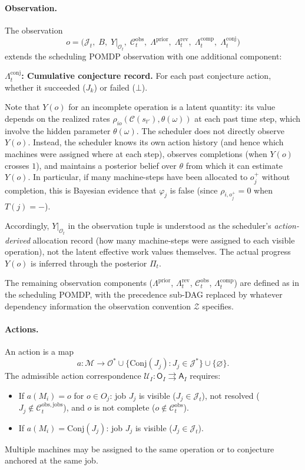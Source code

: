 \paragraph{Observation.} The observation
\[
o = \bigl(\mathcal{J}_t,\; B,\; Y|_{\mathcal{O}_t},\;
\mathcal{C}_t^{\mathrm{obs}},\;
\Lambda^{\mathrm{prior}},\; \Lambda_t^{\mathrm{rev}},\;
\Lambda_t^{\mathrm{comp}},\; \Lambda_t^{\mathrm{conj}}\bigr)
\]
extends the scheduling POMDP observation with one additional component:

\medskip
\noindent\textbf{$\Lambda_t^{\mathrm{conj}}$: Cumulative conjecture record.}
For each past conjecture action, whether it succeeded ($J_k$) or failed ($\bot$).

\medskip
\noindent Note that $Y(o)$ for an incomplete operation is a latent quantity: its
value depends on the realized rates
$\rho_{io}(\mathcal{C}(s_{t'}), \theta(\omega))$ at each past time step, which
involve the hidden parameter $\theta(\omega)$. The scheduler does not directly
observe $Y(o)$. Instead, the scheduler knows its own action history (and hence which
machines were assigned where at each step), observes completions (when $Y(o)$
crosses $1$), and maintains a posterior belief over $\theta$ from which it can
estimate $Y(o)$. In particular, if many machine-steps have been allocated to $o_j^+$
without completion, this is Bayesian evidence that $\varphi_j$ is false (since
$\rho_{i,o_j^+} = 0$ when $T(j) = -$).

Accordingly, $Y|_{\mathcal{O}_t}$ in the observation tuple is understood as the
scheduler's \emph{action-derived} allocation record (how many machine-steps were
assigned to each visible operation), not the latent effective work values themselves.
The actual progress $Y(o)$ is inferred through the posterior $\Pi_t$.

The remaining observation
components ($\Lambda^{\mathrm{prior}}$, $\Lambda_t^{\mathrm{rev}}$,
$\mathcal{C}_t^{\mathrm{obs}}$, $\Lambda_t^{\mathrm{comp}}$) are defined as in the
scheduling POMDP, with the precedence sub-DAG replaced by whatever dependency
information the observation convention $\mathcal{Z}$ specifies.

\paragraph{Actions.} An action is a map
\[
a : \mathcal{M} \to \mathcal{O}^* \cup
\{\mathrm{Conj}(J_j) : J_j \in \mathcal{J}^*\} \cup \{\varnothing\}.
\]
The admissible action correspondence
$\mathcal{U}_I : \mathsf{O}_I \rightrightarrows \mathsf{A}_I$ requires:
\begin{itemize}
    \item[\textbf{(A1)}] If $a(M_i) = o$ for $o \in O_j$: job $J_j$ is visible
    ($J_j \in \mathcal{J}_t$), not resolved
    ($J_j \notin \mathcal{C}_t^{\mathrm{obs,jobs}}$), and $o$ is not complete
    ($o \notin \mathcal{C}_t^{\mathrm{obs}}$).

    \item[\textbf{(A2)}] If $a(M_i) = \mathrm{Conj}(J_j)$: job $J_j$ is visible
    ($J_j \in \mathcal{J}_t$).
\end{itemize}
Multiple machines may be assigned to the same operation or to conjecture anchored at
the same job.

